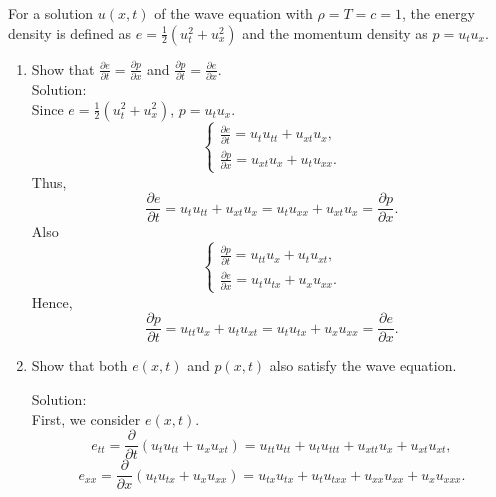 \documentclass[12pt]{article}%
\begin{document}
\begin{enumerate}
\begin{enumerate}
        For a solution $u\left(x,t\right)$ of the wave equation with $\rho = T = c = 1$, the energy density is defined as $e = \frac{1}{2}\left(u_t^2 + u_x^2\right)$ and the momentum density as $p =u_tu_x$.\smallskip 
        \begin{enumerate}
            \item Show that $\frac{\partial e}{\partial t} = \frac{\partial p}{\partial x}$ and $\frac{\partial p}{\partial t} = \frac{\partial e}{\partial x}$. \smallskip \\
            Solution: \\
            Since $e=\frac{1}{2}\left(u_{t}^{2}+u_{x}^{2}\right)$, $p=u_{t} u_{x} $.
            \begin{equation*}
                \begin{cases}
                    \frac{\partial e}{\partial t}=u_{t} u_{tt}+u_{xt} u_{x},
                    \\
                    \frac{\partial p}{\partial x}=u_{xt} u_{x}+u_{t} u_{xx}.
                \end{cases}
            \end{equation*}
            Thus, \[\frac{\partial e}{\partial t}=u_{t} u_{t t}+u_{x t} u_{x}=u_{t} u_{x x}+u_{x t} u_{x}=\frac{\partial p}{\partial x} .\]
            Also
            \begin{equation*}
                \begin{cases}
                    \frac{\partial p}{\partial t}=u_{tt} u_{x}+u_{t} u_{xt},
                    \\
                    \frac{\partial e}{\partial x}=u_{t} u_{tx}+u_{x} u_{xx}.
                \end{cases}
            \end{equation*}
            Hence, \[\frac{\partial p}{\partial t}=u_{tt} u_{x}+u_{t} u_{xt}=u_{t} u_{tx}+u_{x} u_{xx}=\frac{\partial e}{\partial x} .\]
            


            \item Show that both $e\left(x,t\right)$ and $p\left(x,t\right)$ also satisfy the wave equation.    
           
            Solution:\\
             First, we consider $e(x,t).$
            \[e_{tt}  =\frac{\partial}{\partial t}\left(u_{t} u_{tt}+u_{x} u_{xt}\right)=u_{tt} u_{tt}+u_{t} u_{ttt}+u_{xtt} u_{x}+u_{xt} u_{xt},\]          
            \[ e_{xx}  =\frac{\partial}{\partial x}\left(u_{t} u_{tx}+u_{x} u_{xx}\right) =u_{tx} u_{tx}+u_{t} u_{txx}+u_{xx} u_{xx}+u_{x} u_{xxx}. \]
            

\end{enumerate}
\end{enumerate}
\end{enumerate}
\end{document}

